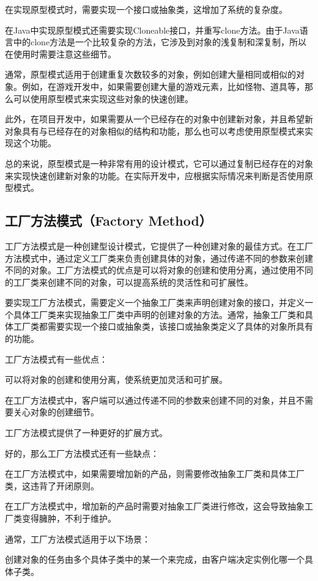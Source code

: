 \documentclass[cn,black,12pt,normal]{elegantnote}
\begin{document}
在实现原型模式时，需要实现一个接口或抽象类，这增加了系统的复杂度。

在Java中实现原型模式还需要实现Cloneable接口，并重写clone方法。由于Java语言中的clone方法是一个比较复杂的方法，它涉及到对象的浅复制和深复制，所以在使用时需要注意这些细节。

通常，原型模式适用于创建重复次数较多的对象，例如创建大量相同或相似的对象。例如，在游戏开发中，如果需要创建大量的游戏元素，比如怪物、道具等，那么可以使用原型模式来实现这些对象的快速创建。

此外，在项目开发中，如果需要从一个已经存在的对象中创建新对象，并且希望新对象具有与已经存在的对象相似的结构和功能，那么也可以考虑使用原型模式来实现这个功能。

总的来说，原型模式是一种非常有用的设计模式，它可以通过复制已经存在的对象来实现快速创建新对象的功能。在实际开发中，应根据实际情况来判断是否使用原型模式。


\subsection{工厂方法模式（Factory Method）}

工厂方法模式是一种创建型设计模式，它提供了一种创建对象的最佳方式。在工厂方法模式中，通过定义工厂类来负责创建具体的对象，通过传递不同的参数来创建不同的对象。工厂方法模式的优点是可以将对象的创建和使用分离，通过使用不同的工厂类来创建不同的对象，可以提高系统的灵活性和可扩展性。

要实现工厂方法模式，需要定义一个抽象工厂类来声明创建对象的接口，并定义一个具体工厂类来实现抽象工厂类中声明的创建对象的方法。通常，抽象工厂类和具体工厂类都需要实现一个接口或抽象类，该接口或抽象类定义了具体的对象所具有的功能。

工厂方法模式有一些优点：

可以将对象的创建和使用分离，使系统更加灵活和可扩展。

在工厂方法模式中，客户端可以通过传递不同的参数来创建不同的对象，并且不需要关心对象的创建细节。

工厂方法模式提供了一种更好的扩展方式。

好的，那么工厂方法模式还有一些缺点：

在工厂方法模式中，如果需要增加新的产品，则需要修改抽象工厂类和具体工厂类，这违背了开闭原则。

在工厂方法模式中，增加新的产品时需要对抽象工厂类进行修改，这会导致抽象工厂类变得臃肿，不利于维护。

通常，工厂方法模式适用于以下场景：

创建对象的任务由多个具体子类中的某一个来完成，由客户端决定实例化哪一个具体子类。
\end{document}
